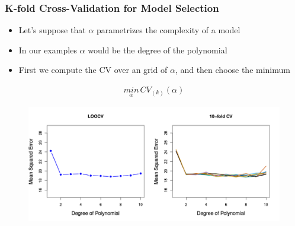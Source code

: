 \documentclass[
  shownotes,
  xcolor={svgnames},
  hyperref={colorlinks,citecolor=DarkBlue,linkcolor=DarkRed,urlcolor=DarkBlue}
  ]{beamer}
\begin{document}
\begin{frame}[fragile]
\frametitle{K-fold Cross-Validation for Model Selection}

\begin{itemize}
  \item Let's suppose that $\alpha$ parametrizes the complexity of a model
  \medskip
  \item In our examples $\alpha$ would be the degree of the polynomial 
  \medskip
  \item First we compute the CV over an grid of $\alpha$, and then choose the minimum

\end{itemize}
\begin{align}
\underset{\alpha}{min} \, CV_{(k)}(\alpha)
\end{align}

        \begin{figure}[H] \centering
            \captionsetup{justification=centering}
              \includegraphics[scale=0.5]{figures/fig54.png}
       \end{figure}

\end{frame}
\end{document}

